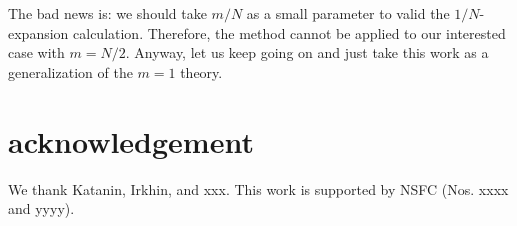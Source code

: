 \documentclass[aps,twocolumn,superscriptaddress]{revtex4-1}
\begin{document}
{\color{red} The bad news is: we should take $m/N$ as a small parameter to valid the $1/N$-expansion calculation. Therefore, the method cannot be applied to our interested case with $m=N/2$. Anyway, let us keep going on and just take this work as a generalization of the $m=1$ theory.}

\section{acknowledgement}
We thank Katanin, Irkhin, and xxx. This work is supported by NSFC (Nos. xxxx and yyyy).



\end{document}
